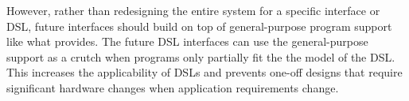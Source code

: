 However, rather than redesigning the entire system for a specific interface or DSL, future interfaces should build on top of general-purpose program support like what \riptide provides.
% 
The future DSL interfaces can use the general-purpose support as a crutch when programs only partially fit the the model of the DSL.
% 
This increases the applicability of DSLs and prevents one-off designs that require significant hardware changes when application requirements change.


